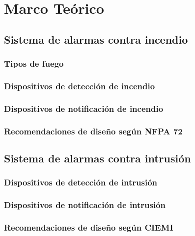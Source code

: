   \chapter{Marco Teórico} 
\label{C:antecedentes}

\section{Sistema de alarmas contra incendio}


\subsection{Tipos de fuego}

\subsection{Dispositivos de detección de incendio}

\subsection{Dispositivos de notificación de incendio}

\subsection{Recomendaciones de diseño según NFPA 72}

\newpage

\section{Sistema de alarmas contra intrusión}


\subsection{Dispositivos de detección de intrusión}

\subsection{Dispositivos de notificación de intrusión}

\subsection{Recomendaciones de diseño según CIEMI}


\newpage


